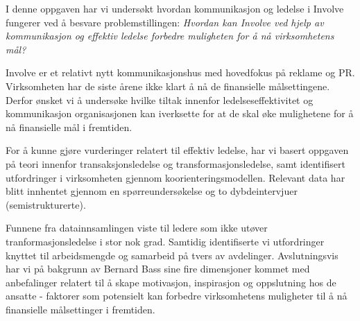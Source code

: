 I denne oppgaven har vi undersøkt hvordan kommunikasjon og ledelse i Involve fungerer ved å besvare problemstillingen: \textit{Hvordan kan Involve ved hjelp av kommunikasjon og effektiv ledelse forbedre muligheten for å nå virksomhetens mål?} 

\indent \newline
Involve er et relativt nytt kommunikasjonshus med hovedfokus på reklame og PR. Virksomheten har de siste årene ikke klart å nå de finansielle målsettingene.
Derfor ønsket vi å undersøke hvilke tiltak innenfor ledelseseffektivitet og kommunikasjon organisasjonen kan iverksette for at de skal øke mulighetene for å nå finansielle mål i fremtiden.

\indent \newline
For å kunne gjøre vurderinger relatert til effektiv ledelse, har vi basert oppgaven på teori innenfor transaksjonsledelse og transformasjonsledelse, samt identifisert utfordringer i virksomheten gjennom koorienteringsmodellen. Relevant data har blitt innhentet gjennom en spørreundersøkelse og to dybdeintervjuer (semistrukturerte).

\indent \newline
Funnene fra datainnsamlingen viste til ledere som ikke utøver tranformasjonsledelse i stor nok grad.  Samtidig identifiserte vi utfordringer knyttet til arbeidsmengde og samarbeid på tvers av avdelinger. Avslutningsvis har vi på bakgrunn av Bernard Bass sine fire dimensjoner kommet med anbefalinger relatert til å skape motivasjon, inspirasjon og oppslutning hos de ansatte - faktorer som potensielt kan forbedre virksomhetens muligheter til å nå finansielle målsettinger i fremtiden.